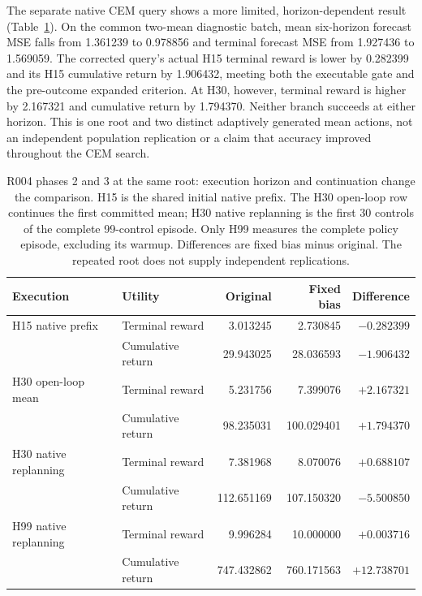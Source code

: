 \documentclass[11pt]{article}
\begin{document}
The separate native CEM query shows a more limited, horizon-dependent result
(Table~\ref{tab:native-bias}). On the common two-mean diagnostic batch, mean
six-horizon forecast MSE falls from 1.361239 to 0.978856 and terminal forecast
MSE from 1.927436 to 1.569059. The corrected query's actual H15 terminal reward
is lower by 0.282399 and its H15 cumulative return by 1.906432, meeting both
the executable gate and the pre-outcome expanded criterion. At H30, however,
terminal reward is higher by 2.167321 and cumulative return by 1.794370.
Neither branch succeeds at either horizon. This is one root and two distinct
adaptively generated mean actions, not an independent population replication
or a claim that accuracy improved throughout the CEM search.

\begin{table}[t]
\centering
\small
\begin{tabular}{llrrr}
\toprule
Execution & Utility & Original & Fixed bias & Difference\\
\midrule
H15 native prefix & Terminal reward & 3.013245 & 2.730845 & $-0.282399$\\
 & Cumulative return & 29.943025 & 28.036593 & $-1.906432$\\
H30 open-loop mean & Terminal reward & 5.231756 & 7.399076 & $+2.167321$\\
 & Cumulative return & 98.235031 & 100.029401 & $+1.794370$\\
\midrule
H30 native replanning & Terminal reward & 7.381968 & 8.070076 & $+0.688107$\\
 & Cumulative return & 112.651169 & 107.150320 & $-5.500850$\\
H99 native replanning & Terminal reward & 9.996284 & 10.000000 & $+0.003716$\\
 & Cumulative return & 747.432862 & 760.171563 & $+12.738701$\\
\bottomrule
\end{tabular}
\caption{R004 phases 2 and 3 at the same root: execution horizon and
continuation change the comparison. H15 is the shared initial native prefix.
The H30 open-loop row continues the first committed mean; H30 native replanning
is the first 30 controls of the complete 99-control episode. Only H99 measures
the complete policy episode, excluding its warmup. Differences are fixed bias
minus original. The repeated root does not supply independent replications.}
\label{tab:native-bias}
\end{table}
\end{document}
